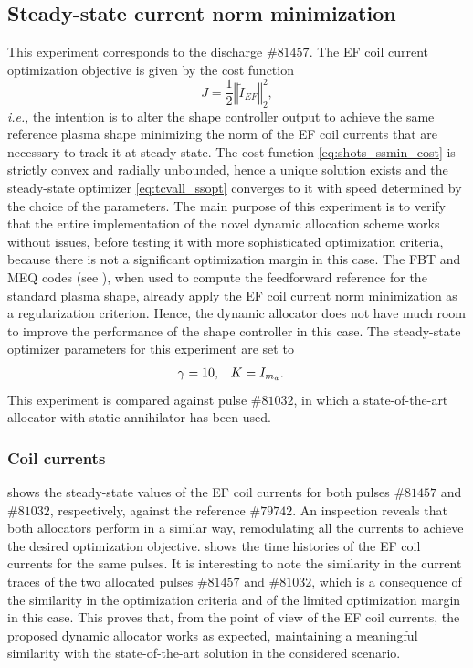 \subsection{Steady-state current norm minimization}
\label{sec:shots_ssmin}
This experiment corresponds to the discharge $\#81457$. The EF coil current optimization objective is given by the cost function
\begin{equation}
  \label{eq:shots_ssmin_cost}
  J = \frac{1}{2} \left\Vert \tilde{I}_{EF} \right\Vert^2_2,
\end{equation}
\emph{i.e.}, the intention is to alter the shape controller output to achieve the same reference plasma shape minimizing the norm of the EF coil currents that are necessary to track it at steady-state. The cost function \eqref{eq:shots_ssmin_cost} is strictly convex and radially unbounded, hence a unique solution exists and the steady-state optimizer \eqref{eq:tcvall_ssopt} converges to it with speed determined by the choice of the parameters. The main purpose of this experiment is to verify that the entire implementation of the novel dynamic allocation scheme works without issues, before testing it with more sophisticated optimization criteria, because there is not a significant optimization margin in this case. The FBT and MEQ codes (see ), when used to compute the feedforward reference for the standard plasma shape, already apply the EF coil current norm minimization as a regularization criterion. Hence, the dynamic allocator does not have much room to improve the performance of the shape controller in this case. The steady-state optimizer parameters for this experiment are set to
\begin{align}
  \label{eq:shots_ssmin_params}
  \gamma &= 10, & K &= I_{m_a}.
\end{align}
This experiment is compared against pulse $\#81032$, in which a state-of-the-art allocator with static annihilator has been used.

\subsubsection{Coil currents}
\label{sec:shots_ssmin_currs}
 shows the steady-state values of the EF coil currents for both pulses $\#81457$ and $\#81032$, respectively, against the reference $\#79742$. An inspection reveals that both allocators perform in a similar way, remodulating all the currents to achieve the desired optimization objective.  shows the time histories of the EF coil currents for the same pulses. It is interesting to note the similarity in the current traces of the two allocated pulses $\#81457$ and $\#81032$, which is a consequence of the similarity in the optimization criteria and of the limited optimization margin in this case. This proves that, from the point of view of the EF coil currents, the proposed dynamic allocator works as expected, maintaining a meaningful similarity with the state-of-the-art solution in the considered scenario.

